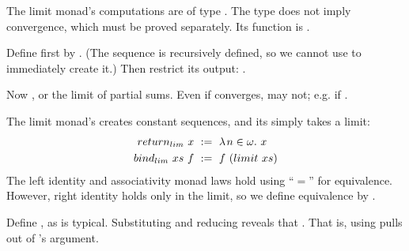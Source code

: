 The limit monad's computations are of type \tlzfc{\lnat \to \metricuniv}. The type does not imply convergence, which must be proved separately. Its  function is .

\begin{example}
Define  first by
.
(The sequence is recursively defined, so we cannot use  to immediately create it.)
Then restrict its output: .
\begin{comment}
\begin{equation}
\lzfc{
  partial!sums~xs\ \objdef\ 
  \ilzfclet{
    ys~n & if~(n = 0)~(xs~0)~((xs~n) + (ys~(n - 1)))
  }{ys\lvert_\lnat}
}
\end{equation}
\end{comment}

Now
, or the limit of partial sums.
Even if \tlzfc{xs} converges, \tlzfc{partial!sums~xs} may not; e.g. if \tlzfc{xs = \fun{n \in \lnat} \frac{1}{n+1}}.
\exampleqed
\end{example}

The limit monad's  creates constant sequences, and its
 simply takes a limit:
\begin{equation}
\begin{aligned}
  return_{lim}~x &\ :=\ \lambda\mspace{2mu}{n \in \omega}\ldotp\,{x} \\
  bind_{lim}~xs~f &\ :=\ f~(limit~xs)
\end{aligned}
\end{equation}
The left identity and associativity monad laws hold using ``$=$'' for equivalence. However, right identity holds only in the limit, so we define equivalence by .

\begin{example}[lifting]
Define , as is typical. Substituting  and reducing reveals that . That is, using  pulls  out of 's argument.
\exampleqed
\end{example}

